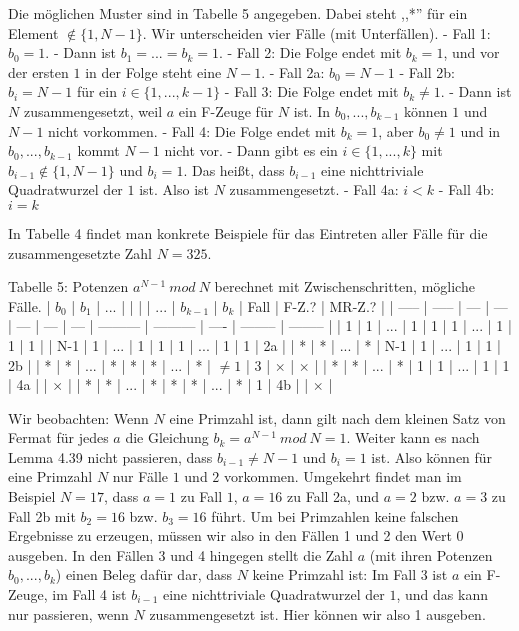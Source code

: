 \documentclass[a4paper]{article}
\begin{document}
\begin{multicols}{3}
        Die möglichen Muster sind in Tabelle 5 angegeben. Dabei steht ,,*'' für ein Element $\not\in\{1,N-1\}$. Wir unterscheiden vier Fälle (mit Unterfällen).
        - Fall 1: $b_0 = 1$. - Dann ist $b_1 =...=b_k= 1$.
        - Fall 2: Die Folge endet mit $b_k= 1$, und vor der ersten $1$ in der Folge steht eine $N-1$.
        - Fall 2a: $b_0 =N-1$
        - Fall 2b: $b_i=N-1$ für ein $i\in\{1,...,k-1\}$
        - Fall 3: Die Folge endet mit $b_k\not= 1$. - Dann ist $N$ zusammengesetzt, weil $a$ ein F-Zeuge für $N$ ist. In $b_0,...,b_{k-1}$ können $1$ und $N-1$ nicht vorkommen.
        - Fall 4: Die Folge endet mit $b_k=1$, aber $b_0\not= 1$ und in $b_0,...,b_{k-1}$ kommt $N-1$ nicht vor. - Dann gibt es ein $i\in\{1,...,k\}$ mit $b_{i-1}\not\in\{1,N-1\}$ und $b_i=1$. Das heißt, dass $b_{i-1}$ eine nichttriviale Quadratwurzel der $1$ ist. Also ist $N$ zusammengesetzt.
        - Fall 4a: $i<k$
        - Fall 4b: $i=k$

        In Tabelle 4 findet man konkrete Beispiele für das Eintreten aller Fälle für die zusammengesetzte Zahl $N=325$.

        Tabelle 5: Potenzen $a^{N-1}\ mod\ N$ berechnet mit Zwischenschritten, mögliche Fälle.
        | $b_0$ | $b_1$ | ... |     |     |     | ... | $b_{k-1}$ | $b_k$     | Fall | F-Z.?    | MR-Z.?   |
        | ----- | ----- | --- | --- | --- | --- | --- | --------- | --------- | ---- | -------- | -------- |
        | 1     | 1     | ... | 1   | 1   | 1   | ... | 1         | 1         | 1    |
        | N-1   | 1     | ... | 1   | 1   | 1   | ... | 1         | 1         | 2a   |
        | *     | *     | ... | *   | N-1 | 1   | ... | 1         | 1         | 2b   |
        | *     | *     | ... | *   | *   | *   | ... | *         | $\not= 1$ | 3    | $\times$ | $\times$ |
        | *     | *     | ... | *   | 1   | 1   | ... | 1         | 1         | 4a   |          | $\times$ |
        | *     | *     | ... | *   | *   | *   | ... | *         | 1         | 4b   |          | $\times$ |

        Wir beobachten: Wenn $N$ eine Primzahl ist, dann gilt nach dem kleinen Satz von Fermat für jedes $a$ die Gleichung $b_k=a^{N-1}\ mod\ N=1$. Weiter kann es nach Lemma 4.39 nicht passieren, dass $b_{i-1}\not=N-1$ und $b_i=1$ ist. Also können für eine Primzahl $N$ nur Fälle $1$ und $2$ vorkommen. Umgekehrt findet man im Beispiel $N=17$, dass $a=1$ zu Fall $1$, $a=16$ zu Fall 2a, und $a=2$ bzw. $a=3$ zu Fall 2b mit $b_2=16$ bzw. $b_3=16$ führt. Um bei Primzahlen keine falschen Ergebnisse zu erzeugen, müssen wir also in den Fällen 1 und 2 den Wert 0 ausgeben. In den Fällen 3 und 4 hingegen stellt die Zahl $a$ (mit ihren Potenzen $b_0,...,b_k$) einen Beleg dafür dar, dass $N$ keine Primzahl ist: Im Fall 3 ist $a$ ein F-Zeuge, im Fall 4 ist $b_{i-1}$ eine nichttriviale Quadratwurzel der $1$, und das kann nur passieren, wenn $N$ zusammengesetzt ist. Hier können wir also 1 ausgeben.


\end{multicols}
\end{document}
